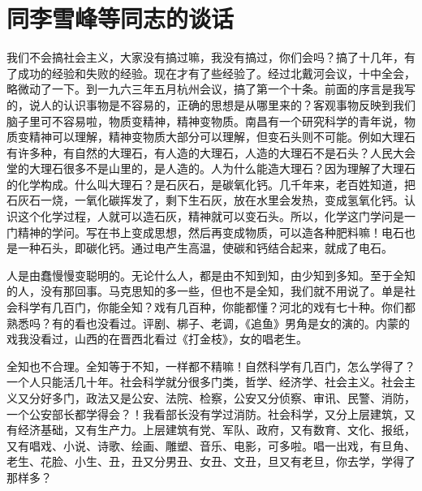 \section[同李雪峰等同志的谈话（一九六四年八月二十日）]{同李雪峰等同志的谈话}


我们不会搞社会主义，大家没有搞过嘛，我没有搞过，你们会吗？搞了十几年，有了成功的经验和失败的经验。现在才有了些经验了。经过北戴河会议，十中全会，略微动了一下。到一九六三年五月杭州会议，搞了第一个十条。前面的序言是我写的，说人的认识事物是不容易的，正确的思想是从哪里来的？客观事物反映到我们脑子里可不容易啦，物质变精神，精神变物质。南昌有一个研究科学的青年说，物质变精神可以理解，精神变物质大部分可以理解，但变石头则不可能。例如大理石有许多种，有自然的大理石，有人造的大理石，人造的大理石不是石头？人民大会堂的大理石很多不是山里的，是人造的。人为什么能造大理石？因为理解了大理石的化学构成。什么叫大理石？是石灰石，是碳氧化钙。几千年来，老百姓知道，把石灰石一烧，一氧化碳挥发了，剩下生石灰，放在水里会发热，变成氢氧化钙。认识这个化学过程，人就可以造石灰，精神就可以变石头。所以，化学这门学问是一门精神的学问。写在书上变成思想，然后再变成物质，可以造各种肥料嘛！电石也是一种石头，即碳化钙。通过电产生高温，使碳和钙结合起来，就成了电石。

人是由蠢慢慢变聪明的。无论什么人，都是由不知到知，由少知到多知。至于全知的人，没有那回事。马克思知的多一些，但也不是全知，我们就不用说了。单是社会科学有几百门，你能全知？戏有几百种，你能都懂？河北的戏有七十种。你们都熟悉吗？有的看也没看过。评剧、梆子、老调，《追鱼》男角是女的演的。内蒙的戏我没看过，山西的在晋西北看过《打金枝》，女的唱老生。

全知也不合理。全知等于不知，一样都不精嘛！自然科学有几百门，怎么学得了？一个人只能活几十年。社会科学就分很多门类，哲学、经济学、社会主义。社会主义又分好多门，政法又是公安、法院、检察，公安又分侦察、审讯、民警、消防，一个公安部长都学得会？！我看部长没有学过消防。社会科学，又分上层建筑，又有经济基础，又有生产力。上层建筑有党、军队、政府，又有数育、文化、报纸，又有唱戏、小说、诗歌、绘画、雕塑、音乐、电影，可多啦。唱一出戏，有旦角、老生、花脸、小生、丑，丑又分男丑、女丑、文丑，旦又有老旦，你去学，学得了那样多？

